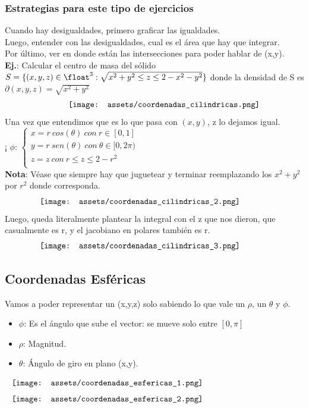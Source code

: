 \documentclass[10pt,a4paper]{article}
\begin{document}
\subsubsection*{Estrategias para este tipo de ejercicios}
Cuando hay desigualdades, primero graficar las igualdades. \\
Luego, entender con las desigualdades, cual es el área que hay que integrar. \\
Por último, ver en donde están las intersecciones para poder hablar de (x,y). \\
\textbf{Ej.}: Calcular el centro de masa del sólido $S = \{(x,y,z) \in \float^{3}: \sqrt{x^{2}+y^{2} \le z \le 2-x^{2}-y^{2}}\}$ donde la densidad de S es $\partial(x,y,z) = \sqrt{x^{2} + y^{2}}$ 
\[\begin{minipage}[b]{0.6\textwidth}
    \texttt{[image: assets/coordenadas\_cilindricas.png]}
\end{minipage}\]
Una vez que entendimos que es lo que pasa con $(x,y)$, z lo dejamos igual. \\¡
$\phi$: 
$\begin{cases}
    x = r \ cos (\theta) \ con \ r \in [0, 1] \\
    y = r \ sen (\theta) \ con \ \theta \in [0, 2 \pi)\\
    z = z   \ con \ r \le z \le 2-r^{2} \\

\end{cases}$ \\
\textbf{Nota}: Véase que siempre hay que juguetear y terminar reemplazando los $x^{2} + y^{2}$ por $r^{2}$ donde corresponda.
\[\begin{minipage}[b]{0.8\textwidth}
    \texttt{[image: assets/coordenadas\_cilindricas\_2.png]}
\end{minipage}\]
Luego, queda literalmente plantear la integral con el z que nos dieron, que casualmente es r, y el jacobiano en polares también es r.
\[\begin{minipage}[b]{0.8\textwidth}
    \texttt{[image: assets/coordenadas\_cilindricas\_3.png]}
\end{minipage}\]
\subsection*{Coordenadas Esféricas}
Vamos a poder representar un (x,y,z) solo sabiendo lo que vale un $\rho$, un $\theta$ y $\phi$.
\begin{itemize}
    \item $\phi$: Es el ángulo que sube el vector: se mueve solo entre $[0, \pi]$
    \item $\rho$: Magnitud.
    \item $\theta$: Ángulo de giro en plano (x,y).
\end{itemize}
\[\begin{minipage}[b]{1\textwidth}
    \texttt{[image: assets/coordenadas\_esfericas\_1.png]}
\end{minipage}\]
\[\begin{minipage}[b]{1\textwidth}
    \texttt{[image: assets/coordenadas\_esfericas\_2.png]}
\end{minipage}\]
\end{document}

